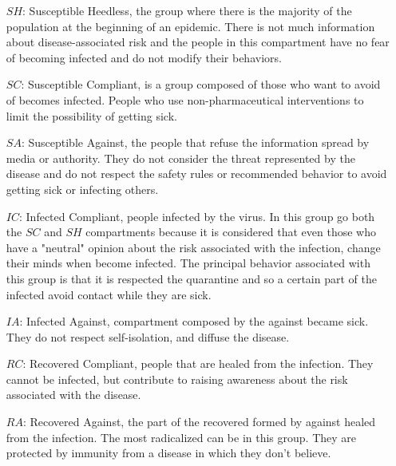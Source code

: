 \begin{itemize}
	\item[$SH$:] Susceptible Heedless, the group where there is the majority of the population at the beginning of an epidemic. There is not much information about disease-associated risk and the people in this compartment have no fear of becoming infected and do not modify their behaviors.
	\item[$SC$:] Susceptible Compliant, is a group composed of those who want to avoid of becomes infected. People who use non-pharmaceutical interventions to limit the possibility of getting sick.
	\item[$SA$:] Susceptible Against, the people that refuse the information spread by media or authority. They do not consider the threat represented by the disease and do not respect the safety rules or recommended behavior to avoid getting sick or infecting others. 
	\item[$IC$:] Infected Compliant, people infected by the virus. In this group go both the $SC$ and $SH$ compartments because it is considered that even those who have a "neutral" opinion about the risk associated with the infection, change their minds when become infected. The principal behavior associated with this group is that it is respected the quarantine and so a certain part of the infected avoid contact while they are sick.
	\item[$IA$:] Infected Against, compartment composed by the against became sick. They do not respect self-isolation, and diffuse the disease. 
	\item[$RC$:] Recovered Compliant, people that are healed from the infection. They cannot be infected, but contribute to raising awareness about the risk associated with the disease. 
	\item[$RA$:] Recovered Against, the part of the recovered formed by against healed from the infection. The most radicalized can be in this group. They are protected by immunity from a disease in which they don't believe. 
\end{itemize}

